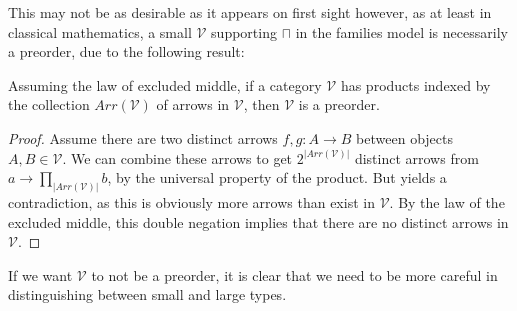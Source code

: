 This may not be as desirable as it appears on first sight however, as at least in classical mathematics, a small $\mathcal{V}$ supporting $\sqcap$ in the families model is necessarily a preorder, due to the following result:
\begin{thm}
Assuming the law of excluded middle, if a category $\mathcal{V}$ has products indexed by the collection $Arr(\mathcal{V})$ of arrows in $\mathcal{V}$, then $\mathcal{V}$ is a preorder.
  \begin{proof}
    Assume there are two distinct arrows $f, g : A \to B$ between objects $A, B \in \mathcal{V}$. We can combine these arrows to get $2^{|Arr(\mathcal{V})|}$ distinct arrows from $a \to \prod_{|Arr(\mathcal{V})|}b$, by the universal property of the product. But yields a contradiction, as this is obviously more arrows than exist in $\mathcal{V}$. By the law of the excluded middle, this double negation implies that there are no distinct arrows in $\mathcal{V}$.
  \end{proof}
\end{thm}
If we want $\mathcal{V}$ to not be a preorder, it is clear that we need to be more careful in distinguishing between small and large types.

